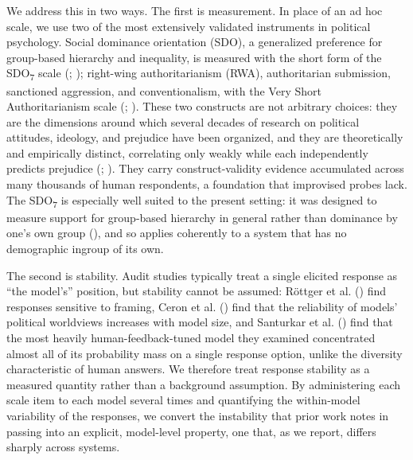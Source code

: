 \documentclass[
]{article}
\begin{document}
We address this in two ways. The first is measurement. In place of an ad
hoc scale, we use two of the most extensively validated instruments in
political psychology. Social dominance orientation (SDO), a generalized
preference for group-based hierarchy and inequality, is measured with
the short form of the SDO\textsubscript{7} scale
(;
); right-wing
authoritarianism (RWA), authoritarian submission, sanctioned aggression,
and conventionalism, with the Very Short Authoritarianism scale
(;
). These two
constructs are not arbitrary choices: they are the dimensions around
which several decades of research on political attitudes, ideology, and
prejudice have been organized, and they are theoretically and
empirically distinct, correlating only weakly while each independently
predicts prejudice (;
). They carry
construct-validity evidence accumulated across many thousands of human
respondents, a foundation that improvised probes lack. The
SDO\textsubscript{7} is especially well suited to the present setting:
it was designed to measure support for group-based hierarchy in general
rather than dominance by one's own group (), and so applies coherently to a system that has no
demographic ingroup of its own.

The second is stability. Audit studies typically treat a single elicited
response as ``the model's'' position, but stability cannot be assumed:
Röttger et al. () find responses
sensitive to framing, Ceron et al. () find
that the reliability of models' political worldviews increases with
model size, and Santurkar et al. ()
find that the most heavily human-feedback-tuned model they examined
concentrated almost all of its probability mass on a single response
option, unlike the diversity characteristic of human answers. We
therefore treat response stability as a measured quantity rather than a
background assumption. By administering each scale item to each model
several times and quantifying the within-model variability of the
responses, we convert the instability that prior work notes in passing
into an explicit, model-level property, one that, as we report, differs
sharply across systems.
\end{document}
